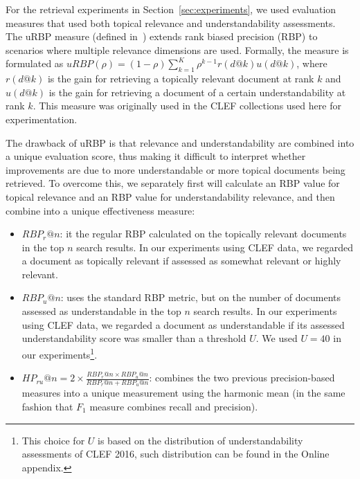 
For the retrieval experiments in Section~\ref{sec:experiments}, we used evaluation measures that used both topical relevance and understandability assessments. The uRBP measure (defined in~\cite{zuccon2016understandability}) extends rank biased precision (RBP) to scenarios where multiple relevance dimensions are used. Formally, the measure is formulated as $uRBP(\rho) = (1 - \rho) \sum_{k=1}^{K} \rho^{k-1} r(d@k) u(d@k)$, where $r(d@k)$ is the gain for retrieving a topically relevant document at rank $k$ and $u(d@k)$ is the gain for retrieving a document of a certain understandability at rank $k$. This measure was originally used in the CLEF collections used here for experimentation. 

The drawback of uRBP is that relevance and understandability are combined into a unique evaluation score, thus making it difficult to interpret whether improvements are due to more understandable or more topical documents being retrieved. To overcome this, we separately first will calculate an RBP value for topical relevance and an RBP value for understandability relevance, and then combine into a unique effectiveness measure:

\begin{itemize}
	\item $RBP_r@n$: it the regular RBP calculated on the topically relevant documents in the top $n$ search results. In our experiments using CLEF data, we regarded a document as topically relevant if assessed as somewhat relevant or highly relevant.
	
    \item $RBP_u@n$: uses the standard RBP metric, but on the number of documents assessed as understandable in the top $n$ search results. In our experiments using CLEF data, we regarded a document as understandable if its assessed understandability score was smaller than a threshold $U$. We used $U = 40$ in our experiments\footnote{This choice for $U$ is based on the distribution of understandability assessments of CLEF 2016, such distribution can be found in the Online appendix.}.
	
    \item $HP_{ru}@n = 2 \times \frac{RBP_r@n \times RBP_u@n}{RBP_r@n + RBP_u@n}$: combines the two previous precision-based measures into a unique measurement using the harmonic mean (in the same fashion that $F_1$ measure combines recall and precision).
\end{itemize}

